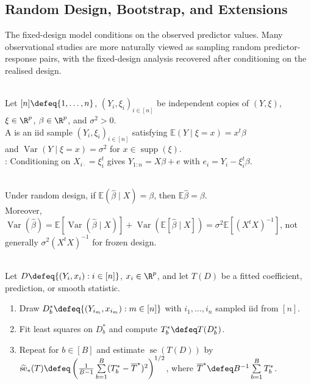 \subsection{Random Design, Bootstrap, and Extensions}

The fixed-design model conditions on the observed predictor values.  Many observational studies are more naturally viewed as sampling random predictor-response pairs, with the fixed-design analysis recovered after conditioning on the realised design.

\begin{definition} \label{def:random-design-linear-regression-model} \\
Let $[n]\defeq\{1,\ldots,n\}$, $(Y_i,\xi_i)_{i\in[n]}$ be independent copies of $(Y,\xi)$, $\xi\in\R^p$, $\beta\in\R^p$, and $\sigma^2>0$.\\
A  is an iid sample $(Y_i,\xi_i)_{i\in[n]}$ satisfying $\mathbb{E}(Y\mid \xi=x)=x^t\beta$\\
and $\operatorname{Var}(Y\mid \xi=x)=\sigma^2$ for $x\in\operatorname{supp}(\xi)$.\\
: Conditioning on $X_{i\cdot}=\xi_i^t$ gives $Y_{1:n}=X\beta+e$ with $e_i=Y_i-\xi_i^t\beta$.
\end{definition}

\begin{remark} \label{rem:random-design-variance-differs} \\
Under random design, if $\mathbb{E}(\widehat{\beta}\mid X)=\beta$, then $\mathbb{E}\widehat{\beta}=\beta$.\\
Moreover, $\operatorname{Var}(\widehat{\beta})=\mathbb{E}[\operatorname{Var}(\widehat{\beta}\mid X)]+\operatorname{Var}(\mathbb{E}[\widehat{\beta}\mid X])=\sigma^2\mathbb{E}[(X^tX)^{-1}]$, not generally $\sigma^2(X^tX)^{-1}$ for frozen design.
\end{remark}

\begin{method} \label{meth:regression-pairs-bootstrap-cross-reference} \\
Let $D\defeq\{(Y_i,x_i):i\in[n]\}$, $x_i\in\R^p$, and let $T(D)$ be a fitted coefficient, prediction, or smooth statistic.
\begin{enumerate}[label=(\roman*)]
\setlength{\itemsep}{0pt}
\item Draw $D_b^*\defeq\{(Y_{i_m},x_{i_m}):m\in[n]\}$ with $i_1,\ldots,i_n$ sampled iid from $[n]$.
\item Fit least squares on $D_b^*$ and compute $T_b^*\defeq T(D_b^*)$.
\item Repeat for $b\in[B]$ and estimate $\operatorname{se}(T(D))$ by $\widehat{\operatorname{se}}_*(T)\defeq\left(\frac{1}{B-1}\sum\limits_{b=1}^{B}(T_b^*-\overline{T}^*)^2\right)^{1/2}$, where $\overline{T}^*\defeq B^{-1}\sum\limits_{b=1}^{B}T_b^*$.
\end{enumerate}
\end{method}

